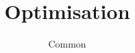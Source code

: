 \documentclass{article}
\begin{document}
\title{Optimisation}
\author{Common}
\maketitle
\newpage
\tableofcontents
\newpage
\end{document}
